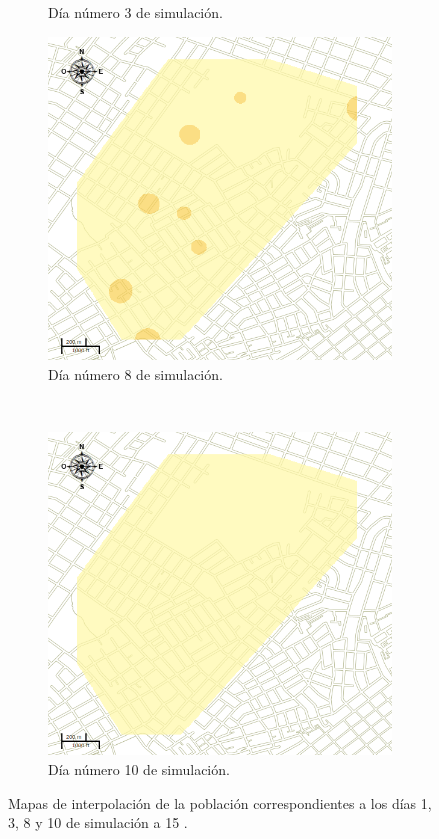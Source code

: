 \begin{figure}[!htbp]
\begin{subfigure}[b]{0.45\textwidth}
            \caption{\label{fig:niveles-infestacion-15-b}Día número 3 de simulación.}
    \end{subfigure}
    \begin{subfigure}[b]{0.45\textwidth}
            \includegraphics[width=\textwidth]{capitulo-6/graphics/raster/temp-15-7.png}
            \caption{\label{fig:niveles-infestacion-15-c}Día número 8 de simulación.}
    \end{subfigure}
    ~~
    \begin{subfigure}[b]{0.45\textwidth}
            \includegraphics[width=\textwidth]{capitulo-6/graphics/raster/temp-15-9.png}
            \caption{\label{fig:niveles-infestacion-15-d}Día número 10 de simulación.}
    \end{subfigure}
    \caption{\label{fig:niveles-infestacion-15} Mapas de interpolación de la población correspondientes a los días 1, 3, 8 y 10 de simulación a 15 \textcelsius.}
\end{figure}

